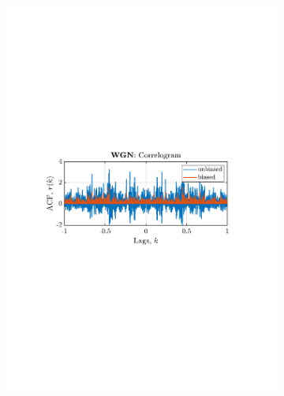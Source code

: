 \documentclass[12pt]{article}
\begin{document}
\begin{figure}[H]
\begin{subfigure}{0.49\textwidth}
			\includegraphics[trim={2.2cm 11cm 3.15cm  11.2cm}, clip, width=\textwidth]{../MATLAB/figures/q1_3a_fig02.pdf} 
		\end{subfigure}
				\begin{subfigure}{0.49\textwidth}
			\centering

\end{subfigure}
\end{figure}
\end{document}
